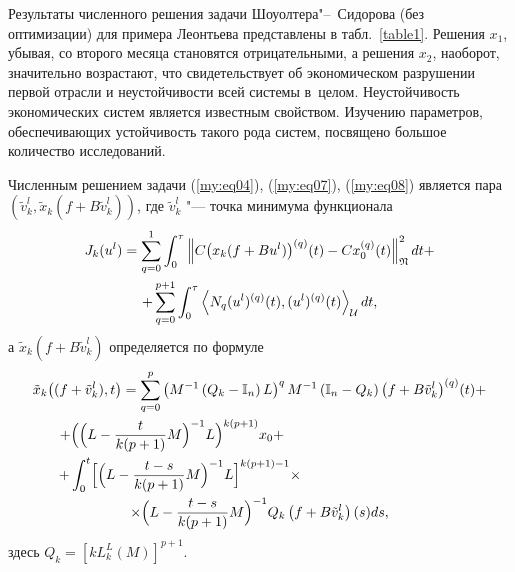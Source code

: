 Результаты численного решения задачи Шоуолтера"--~Сидорова (без оптимизации)  для примера Леонтьева представлены в табл.~\ref{table1}. 
Решения $x_{1}$, убывая, со второго месяца становятся отрицательными, а решения $x_{2}$, наоборот, значительно возрастают, что свидетельствует об экономическом разрушении первой отрасли и неустойчивости всей системы в~целом. 
Неустойчивость экономических систем является известным свойством. 
Изучению параметров, обеспечивающих устойчивость такого рода систем, посвящено большое количество исследований.

Численным решением задачи (\ref{my:eq04}), (\ref{my:eq07}), (\ref{my:eq08}) является пара $\left(\tilde{v}_{k}^{l},\tilde{x}_{k}\left(f+B\tilde{v}_{k}^{l}\right) \right)$, где
$\tilde{v}_{k}^{l}$ "--- точка минимума функционала
\begin{multline*}
J_{k}(u^{l}) = \sum\limits^{1}_{q=0}  \int^{\tau}_{0}   \left\|C  \bigl(x_{k}(f + Bu^{l}) \bigr)^{(q)}   (t)  -  Cx^{(q)}_{0} (t)\right\|^{2}_{{\mathfrak N}}   dt +  \\ +
\sum\limits^{p+1}_{q=0}  \int^{\tau}_{0}   \left\langle  N_{q} (u^l)^{(q)} (t), (u^l)^{(q)} (t) \right\rangle_{{\cal U}}  dt,
\end{multline*}
а $\tilde{x}_{k}\left(f+B\tilde{v}_{k}^{l}\right)$ определяется по формуле
\begin{multline}
\tilde{x}_{k}\bigl( (f +\tilde{v}_{k}^{l}),t \bigr) =  \sum\limits^{p}_{q=0} \left( M^{-1} \left( Q_{k}- {\mathbb I}_{n} \right) L \right)^{q} M^{-1} \left( {\mathbb I}_{n}- Q_{k} \right) \bigl( f+B\tilde{v}_{k}^{l}\bigr)^{(q)}  (t)  +
\\
 + \Bigl( \Bigl(L-\frac{t}{k(p+1)} M\Bigr)^{-1} L\Bigr)^{k(p+1)} x_{0}  +  \hspace{4.4cm}
\\
 +   \int^{t}_{0}  \Bigl[ \Bigl(L - \frac{t-s}{k(p+1)}M\Bigr)^{-1}     L\Bigr]^{k(p+1)-1} \times  \hspace{4cm}
  \\
 \times   \Bigl(L - \frac{t-s}{k(p+1)}M\Bigr)^{-1}   Q_{k}\left(f+B\tilde{v}_{k}^{l}\right)  (s)ds,    
\end{multline}
здесь $Q_{k}=\left[ k L^{L}_{k}\left(M\right)\right]^{p+1}$.

